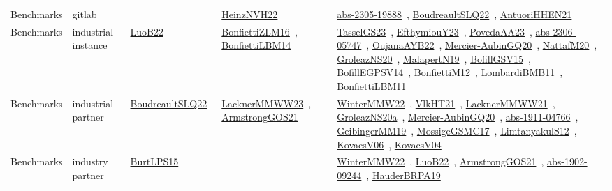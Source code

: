 {\begin{longtable}{lp{3cm}>{\raggedright\arraybackslash}p{6cm}>{\raggedright\arraybackslash}p{6cm}>{\raggedright\arraybackslash}p{8cm}}
Benchmarks & gitlab &  & \href{articles/HeinzNVH22.pdf}{HeinzNVH22}~\cite{HeinzNVH22} & \href{articles/abs-2305-19888.pdf}{abs-2305-19888}~\cite{abs-2305-19888}, \href{papers/BoudreaultSLQ22.pdf}{BoudreaultSLQ22}~\cite{BoudreaultSLQ22}, \href{papers/AntuoriHHEN21.pdf}{AntuoriHHEN21}~\cite{AntuoriHHEN21}\\
Benchmarks & industrial instance & \href{papers/LuoB22.pdf}{LuoB22}~\cite{LuoB22} & \href{papers/BonfiettiZLM16.pdf}{BonfiettiZLM16}~\cite{BonfiettiZLM16}, \href{articles/BonfiettiLBM14.pdf}{BonfiettiLBM14}~\cite{BonfiettiLBM14} & \href{papers/TasselGS23.pdf}{TasselGS23}~\cite{TasselGS23}, \href{papers/EfthymiouY23.pdf}{EfthymiouY23}~\cite{EfthymiouY23}, \href{papers/PovedaAA23.pdf}{PovedaAA23}~\cite{PovedaAA23}, \href{articles/abs-2306-05747.pdf}{abs-2306-05747}~\cite{abs-2306-05747}, \href{papers/OujanaAYB22.pdf}{OujanaAYB22}~\cite{OujanaAYB22}, \href{papers/Mercier-AubinGQ20.pdf}{Mercier-AubinGQ20}~\cite{Mercier-AubinGQ20}, \href{papers/NattafM20.pdf}{NattafM20}~\cite{NattafM20}, \href{papers/GroleazNS20.pdf}{GroleazNS20}~\cite{GroleazNS20}, \href{papers/MalapertN19.pdf}{MalapertN19}~\cite{MalapertN19}, \href{papers/BofillGSV15.pdf}{BofillGSV15}~\cite{BofillGSV15}, \href{papers/BofillEGPSV14.pdf}{BofillEGPSV14}~\cite{BofillEGPSV14}, \href{papers/BonfiettiM12.pdf}{BonfiettiM12}~\cite{BonfiettiM12}, \href{papers/LombardiBMB11.pdf}{LombardiBMB11}~\cite{LombardiBMB11}, \href{papers/BonfiettiLBM11.pdf}{BonfiettiLBM11}~\cite{BonfiettiLBM11}\\
Benchmarks & industrial partner & \href{papers/BoudreaultSLQ22.pdf}{BoudreaultSLQ22}~\cite{BoudreaultSLQ22} & \href{articles/LacknerMMWW23.pdf}{LacknerMMWW23}~\cite{LacknerMMWW23}, \href{papers/ArmstrongGOS21.pdf}{ArmstrongGOS21}~\cite{ArmstrongGOS21} & \href{papers/WinterMMW22.pdf}{WinterMMW22}~\cite{WinterMMW22}, \href{articles/VlkHT21.pdf}{VlkHT21}~\cite{VlkHT21}, \href{papers/LacknerMMWW21.pdf}{LacknerMMWW21}~\cite{LacknerMMWW21}, \href{papers/GroleazNS20a.pdf}{GroleazNS20a}~\cite{GroleazNS20a}, \href{papers/Mercier-AubinGQ20.pdf}{Mercier-AubinGQ20}~\cite{Mercier-AubinGQ20}, \href{articles/abs-1911-04766.pdf}{abs-1911-04766}~\cite{abs-1911-04766}, \href{papers/GeibingerMM19.pdf}{GeibingerMM19}~\cite{GeibingerMM19}, \href{papers/MossigeGSMC17.pdf}{MossigeGSMC17}~\cite{MossigeGSMC17}, \href{articles/LimtanyakulS12.pdf}{LimtanyakulS12}~\cite{LimtanyakulS12}, \href{papers/KovacsV06.pdf}{KovacsV06}~\cite{KovacsV06}, \href{papers/KovacsV04.pdf}{KovacsV04}~\cite{KovacsV04}\\
Benchmarks & industry partner & \href{papers/BurtLPS15.pdf}{BurtLPS15}~\cite{BurtLPS15} &  & \href{papers/WinterMMW22.pdf}{WinterMMW22}~\cite{WinterMMW22}, \href{papers/LuoB22.pdf}{LuoB22}~\cite{LuoB22}, \href{papers/ArmstrongGOS21.pdf}{ArmstrongGOS21}~\cite{ArmstrongGOS21}, \href{articles/abs-1902-09244.pdf}{abs-1902-09244}~\cite{abs-1902-09244}, \href{articles/HauderBRPA19.pdf}{HauderBRPA19}~\cite{HauderBRPA19}\\

\end{longtable}}
